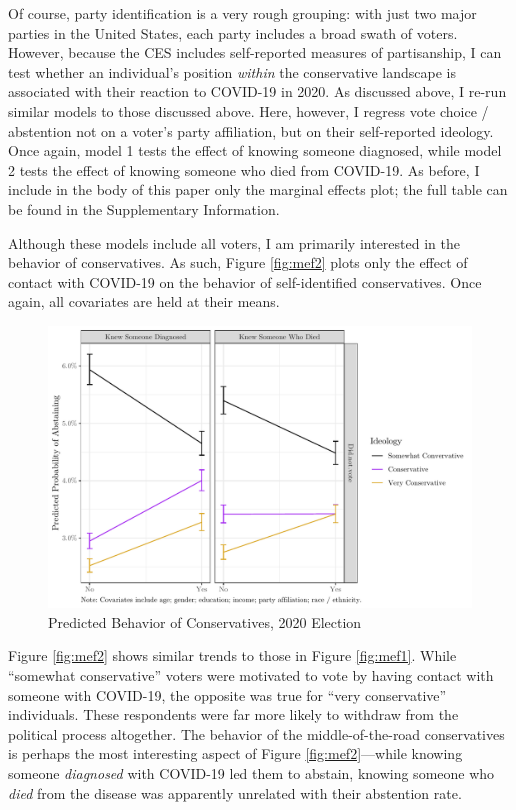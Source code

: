 \documentclass[
  12pt,
]{article}
\begin{document}
Of course, party identification is a very rough grouping: with just two major parties in the United States, each party includes a broad swath of voters. However, because the CES includes self-reported measures of partisanship, I can test whether an individual's position \emph{within} the conservative landscape is associated with their reaction to COVID-19 in 2020. As discussed above, I re-run similar models to those discussed above. Here, however, I regress vote choice / abstention not on a voter's party affiliation, but on their self-reported ideology. Once again, model 1 tests the effect of knowing someone diagnosed, while model 2 tests the effect of knowing someone who died from COVID-19. As before, I include in the body of this paper only the marginal effects plot; the full table can be found in the Supplementary Information.

Although these models include all voters, I am primarily interested in the behavior of conservatives. As such, Figure \ref{fig:mef2} plots only the effect of contact with COVID-19 on the behavior of self-identified conservatives. Once again, all covariates are held at their means.

\begin{figure}[!htbp]

{\centering \includegraphics{theory_paper_files/figure-latex/mef2-c-1} 

}

\caption{\label{fig:mef2}Predicted Behavior of Conservatives, 2020 Election}\label{fig:mef2-c}
\end{figure}

Figure \ref{fig:mef2} shows similar trends to those in Figure \ref{fig:mef1}. While ``somewhat conservative'' voters were motivated to vote by having contact with someone with COVID-19, the opposite was true for ``very conservative'' individuals. These respondents were far more likely to withdraw from the political process altogether. The behavior of the middle-of-the-road conservatives is perhaps the most interesting aspect of Figure \ref{fig:mef2}---while knowing someone \emph{diagnosed} with COVID-19 led them to abstain, knowing someone who \emph{died} from the disease was apparently unrelated with their abstention rate.
\end{document}
